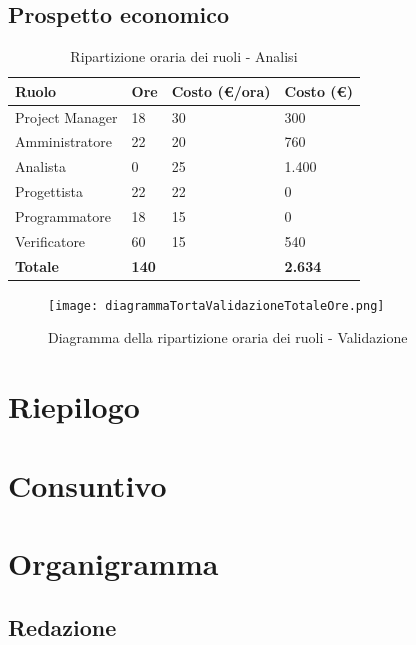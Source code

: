 \documentclass[12pt,a4paper]{article}
\begin{document}
\subsection{Prospetto economico}

\begin{table}[h]
\begin{center}
\begin{tabular}{p{} p{} p{} p{} }
\toprule
\textbf{Ruolo}	& \textbf{Ore} & \textbf{Costo (\euro/ora)}	& \textbf{Costo (\euro)} \\
\midrule
\midrule
Project Manager & 18 & 30 & 300\\
\midrule
Amministratore & 22 & 20 & 760\\ 
\midrule
Analista & 0 & 25 & 1.400\\ 
\midrule
Progettista &22 & 22 & 0\\ 
\midrule
Programmatore & 18 & 15 & 0\\ 
\midrule
Verificatore & 60 & 15 & 540\\ 
\midrule
\textbf{Totale} & \textbf{140} &  & \textbf{2.634}\\
\bottomrule
\end{tabular}
\caption{Ripartizione oraria dei ruoli - Analisi}
\end{center}
\end{table}

\begin{center}
\begin{figure}[h]
\centering
\texttt{[image: diagrammaTortaValidazioneTotaleOre.png]}
\caption{Diagramma della ripartizione oraria dei ruoli - Validazione}
\end{figure}
\end{center}
\newpage


\section{Riepilogo}


\newpage
\section{Consuntivo}

\newpage
\appendix
\section{Organigramma}

\subsection{Redazione}
\end{document}
